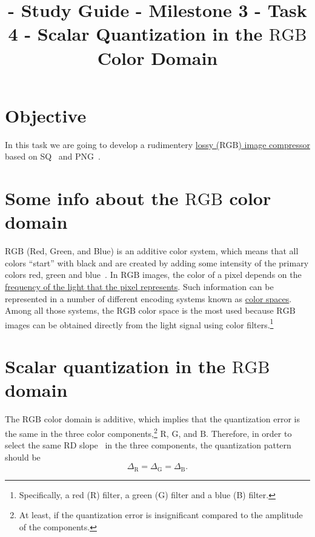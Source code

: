 

\title{\SM{} - Study Guide - Milestone 3 - Task 4 - Scalar Quantization in the $\text{RGB}$ Color Domain}

\maketitle

\tableofcontents

\section{Objective}
In this task we are going to develop a rudimentery \href{https://en.wikipedia.org/wiki/Lossy_compression}{lossy
($\text{RGB}$) image compressor} based on
SQ~\cite{vruiz__scalar_quantization} and PNG~\cite{vruiz__PNG}. 

\section{Some info about the $\text{RGB}$ color domain}

$\text{RGB}$ (Red, Green, and Blue) is an additive color system, which
means that all colors ``start'' with black and are created by adding
some intensity of the primary colors red, green and
blue~\cite{burger2016digital}. In $\text{RGB}$ images, the color of a
pixel depends on the
\href{https://en.wikipedia.org/wiki/Visible_spectrum}{frequency of the
  light that the pixel represents}. Such information can be
represented in a number of different encoding systems known as
\href{https://en.wikipedia.org/wiki/Color_space}{color spaces}. Among
all those systems, the $\text{RGB}$ color space is the most used
because $\text{RGB}$ images can be obtained directly from the light
signal using color filters.\footnote{Specifically, a red (R) filter, a
green (G) filter and a blue (B) filter.}


\section{Scalar quantization in the $\text{RGB}$ domain}

The $\text{RGB}$ color domain is additive, which implies that the
quantization error is the same in the three color
components,\footnote{At least, if the quantization error is
insignificant compared to the amplitude of the components.}
$\text{R}$, $\text{G}$, and $\text{B}$. Therefore, in order to select
the same RD slope~\cite{vruiz__information_theory} in the three
components, the quantization pattern should be
\begin{equation}
  \Delta_\text{R} = \Delta_\text{G} = \Delta_\text{B}.
  \label{eq:same_delta}
\end{equation}

